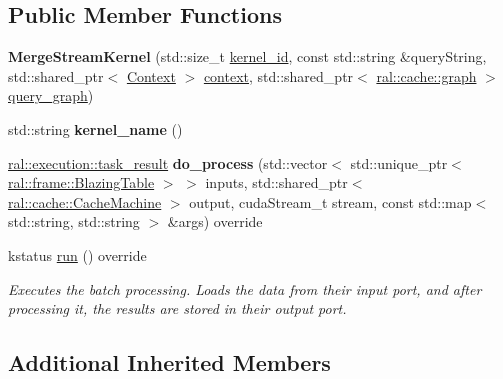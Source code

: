 \subsection*{Public Member Functions}
\begin{DoxyCompactItemize}
\item 
\mbox{\label{classral_1_1batch_1_1MergeStreamKernel_a40865734d8efaa62ca0525188e741d00}} 
{\bfseries Merge\+Stream\+Kernel} (std\+::size\+\_\+t \hyperlink{classral_1_1cache_1_1kernel_a2fd708656cb056a41ec635b8bdc4acfe}{kernel\+\_\+id}, const std\+::string \&query\+String, std\+::shared\+\_\+ptr$<$ \hyperlink{classblazingdb_1_1manager_1_1Context}{Context} $>$ \hyperlink{classral_1_1cache_1_1kernel_af0347d14d678cfa7205c1387746a2e1b}{context}, std\+::shared\+\_\+ptr$<$ \hyperlink{classral_1_1cache_1_1graph}{ral\+::cache\+::graph} $>$ \hyperlink{classral_1_1cache_1_1kernel_a5fbb02292aff165a28ef25e75f0d89bd}{query\+\_\+graph})
\item 
\mbox{\label{classral_1_1batch_1_1MergeStreamKernel_a80de349c635b470feedf3d604bcd169e}} 
std\+::string {\bfseries kernel\+\_\+name} ()
\item 
\mbox{\label{classral_1_1batch_1_1MergeStreamKernel_ada49d8f90b0e607d304492e3eecf2f46}} 
\hyperlink{structral_1_1execution_1_1task__result}{ral\+::execution\+::task\+\_\+result} {\bfseries do\+\_\+process} (std\+::vector$<$ std\+::unique\+\_\+ptr$<$ \hyperlink{classral_1_1frame_1_1BlazingTable}{ral\+::frame\+::\+Blazing\+Table} $>$ $>$ inputs, std\+::shared\+\_\+ptr$<$ \hyperlink{classral_1_1cache_1_1CacheMachine}{ral\+::cache\+::\+Cache\+Machine} $>$ output, cuda\+Stream\+\_\+t stream, const std\+::map$<$ std\+::string, std\+::string $>$ \&args) override
\item 
kstatus \hyperlink{classral_1_1batch_1_1MergeStreamKernel_a7d89339b2f4f3adecda2fe64b47948cd}{run} () override
\begin{DoxyCompactList}\small\item\em Executes the batch processing. Loads the data from their input port, and after processing it, the results are stored in their output port. \end{DoxyCompactList}\end{DoxyCompactItemize}
\subsection*{Additional Inherited Members}


